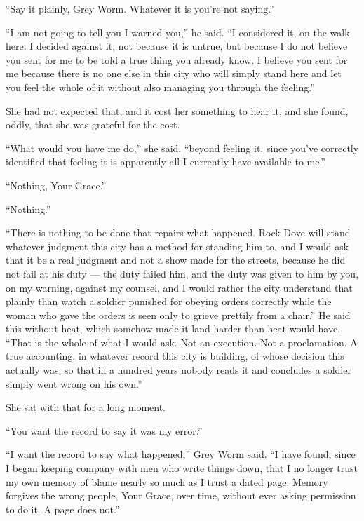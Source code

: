 “Say it plainly, Grey Worm. Whatever it is you’re not saying.”

“I am not going to tell you I warned you,” he said. “I considered it, on the walk here. I decided against it, not because it is untrue, but because I do not believe you sent for me to be told a true thing you already know. I believe you sent for me because there is no one else in this city who will simply stand here and let you feel the whole of it without also managing you through the feeling.”

She had not expected that, and it cost her something to hear it, and she found, oddly, that she was grateful for the cost.

\sceneBreak

“What would you have me do,” she said, “beyond feeling it, since you’ve correctly identified that feeling it is apparently all I currently have available to me.”

“Nothing, Your Grace.”

“Nothing.”

“There is nothing to be done that repairs what happened. Rock Dove will stand whatever judgment this city has a method for standing him to, and I would ask that it be a real judgment and not a show made for the streets, because he did not fail at his duty — the duty failed him, and the duty was given to him by you, on my warning, against my counsel, and I would rather the city understand that plainly than watch a soldier punished for obeying orders correctly while the woman who gave the orders is seen only to grieve prettily from a chair.” He said this without heat, which somehow made it land harder than heat would have. “That is the whole of what I would ask. Not an execution. Not a proclamation. A true accounting, in whatever record this city is building, of whose decision this actually was, so that in a hundred years nobody reads it and concludes a soldier simply went wrong on his own.”

She sat with that for a long moment.

“You want the record to say it was my error.”

“I want the record to say what happened,” Grey Worm said. “I have found, since I began keeping company with men who write things down, that I no longer trust my own memory of blame nearly so much as I trust a dated page. Memory forgives the wrong people, Your Grace, over time, without ever asking permission to do it. A page does not.”

\sceneBreak

